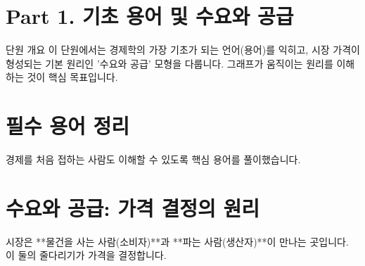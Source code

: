 \documentclass[11pt,a4paper]{article}
\begin{document}
\section*{Part 1. 기초 용어 및 수요와 공급}

\begin{summarybox}{단원 개요}
이 단원에서는 경제학의 가장 기초가 되는 언어(용어)를 익히고, 시장 가격이 형성되는 기본 원리인 '수요와 공급' 모형을 다룹니다. 그래프가 움직이는 원리를 이해하는 것이 핵심 목표입니다.
\end{summarybox}

\section{필수 용어 정리}

경제를 처음 접하는 사람도 이해할 수 있도록 핵심 용어를 풀이했습니다.

\begin{table}[h]
\centering
\caption{미시경제학 핵심 용어 사전}
\label{tab:terminology}
\end{table}

\newpage

\section{수요와 공급: 가격 결정의 원리}

시장은 **물건을 사는 사람(소비자)**과 **파는 사람(생산자)**이 만나는 곳입니다. 이 둘의 줄다리기가 가격을 결정합니다.
\end{document}
